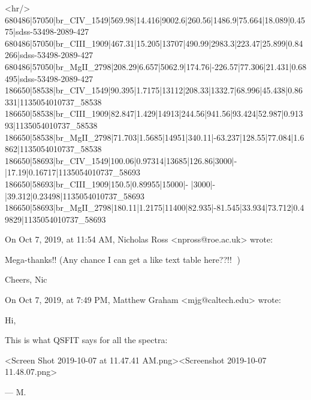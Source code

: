 <hr/>
680486|57050|br_CIV_1549|569.98|14.416|9002.6|260.56|1486.9|75.664|18.089|0.4575|sdss-53498-2089-427
680486|57050|br_CIII_1909|467.31|15.205|13707|490.99|2983.3|223.47|25.899|0.84266|sdss-53498-2089-427
680486|57050|br_MgII_2798|208.29|6.657|5062.9|174.76|-226.57|77.306|21.431|0.68495|sdss-53498-2089-427
186650|58538|br_CIV_1549|90.395|1.7175|13112|208.33|1332.7|68.996|45.438|0.86331|1135054010737_58538
186650|58538|br_CIII_1909|82.847|1.429|14913|244.56|941.56|93.424|52.987|0.91393|1135054010737_58538
186650|58538|br_MgII_2798|71.703|1.5685|14951|340.11|-63.237|128.55|77.084|1.6862|1135054010737_58538
186650|58693|br_CIV_1549|100.06|0.97314|13685|126.86|3000|- |17.19|0.16717|1135054010737_58693
186650|58693|br_CIII_1909|150.5|0.89955|15000|- |3000|- |39.312|0.23498|1135054010737_58693
186650|58693|br_MgII_2798|180.11|1.2175|11400|82.935|-81.545|33.934|73.712|0.49829|1135054010737_58693


On Oct 7, 2019, at 11:54 AM, Nicholas Ross <npross@roe.ac.uk> wrote:

Mega-thanks!! 
(Any chance I can get a like text table here??!! 🙈) 

Cheers, 
Nic


On Oct 7, 2019, at 7:49 PM, Matthew Graham <mjg@caltech.edu> wrote:

Hi,

This is what QSFIT says for all the spectra:


<Screen Shot 2019-10-07 at 11.47.41 AM.png><Screenshot 2019-10-07 11.48.07.png>

— M.
